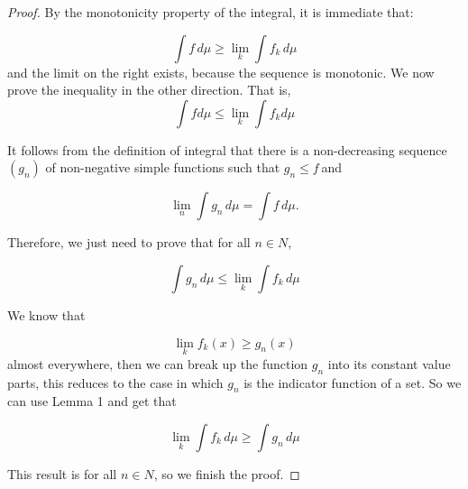\documentclass[12pt]{article}
\theoremstyle{mythm}
\begin{document}
\begin{proof}

By the monotonicity property of the integral, it is immediate that:

$$\displaystyle \int f\,d\mu \geq \lim _{k}\int f_{k}\,d\mu$$
and the limit on the right exists, because the sequence is monotonic. We now prove the inequality in the other direction. That is,
$$\int fd\mu \leq \lim _{k}\int f_{k}d\mu$$

It follows from the definition of integral that there is a non-decreasing sequence $(g_n)$ of non-negative simple functions such that $g_n \leq f$ and

$$\displaystyle \lim _{n}\int g_{n}\,d\mu =\int f\,d\mu .$$

Therefore, we just need to prove that for all $n \in N$,

$$\displaystyle \int g_{n}\,d\mu \leq \lim _{k}\int f_{k}\,d\mu$$

We know that

$$\lim _{k}f_{k}(x)\geq g_n(x)$$
almost everywhere, then we can break up the function $g_n$ into its constant value parts, this reduces to the case in which $g_n$ is the indicator function of a set. So we can use Lemma 1 and get that

$$\lim _{k}\int f_{k}\,d\mu \geq \int g_n\,d\mu$$

This result is for all $n \in N$, so we finish the proof.

\end{proof} 
\end{document}
